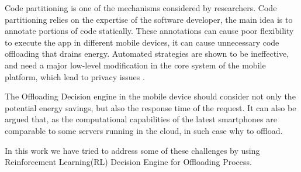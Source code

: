 \documentclass[12pt]{report}
\begin{document}
Code partitioning is one of the mechanisms considered by researchers. Code partitioning relies on the expertise of the software developer, the main idea is to annotate portions of code statically. These annotations can cause poor flexibility to execute the app in different mobile devices, it can cause unnecessary code offloading that drains energy. Automated strategies are shown to be ineffective, and need a major low-level modification in the core system of the mobile platform, which lead to privacy issues \cite{flores2015mobile}.

The Offloading Decision engine in the mobile device should consider not only the potential energy savings, but also the response time of the request. It can also be argued that, as the computational capabilities of the latest smartphones are comparable to some servers running in the cloud, in such case why to offload.

In this work we have tried to address some of these challenges by using Reinforcement Learning(RL) Decision Engine for Offloading Process.
\begin{comment}
\subsection{Contributions} 
This work presents three different techniques used to build Intelligent Offloading Decision Engine with an accuracy and
energy study.

The first two techniques are sensor-based. The first technique is also known the classic
technique. Classic technique utilizes only the accelerometer and magnetometer sensor. These
sensors are used for tracing the paths of the user, which are also known as dead reckoning. 
The
second technique called sensor fusion is a patented technique that uses the accelerometer,
magnetometer and gyroscope sensors for dead reckoning. Sensor fusion uses Kalman filters that
combine the value from the three sensors to give the final accurate values.

The other three techniques are machine learning based techniques that use the three position
sensors (accelerometer, magnetometer, and gyroscope) and the Wi-Fi access points. The three
machine learning techniques are combined in a single platform called LearnLoc. In LearnLoc
data from the position sensors are fused using the sensor fusion algorithm and a Wi-Fi
fingerprint of the area is collected. The Wi-Fi signal strength fingerprints are used by the
machine-learning algorithms to accurately predict the user’s location. We use three different
machine-learning techniques – Linear Regression, Neural Networks and K Nearest Neighbors.
We quantify and present the energy consumption for each technique. An accuracy study is also
presented for all our techniques. An energy and accuracy trade-off study has been done to find
out what is the optimum Wi-Fi scan rate for accurate Indoor Localization with the least energy
consumption.
\end{comment}
\end{document}
